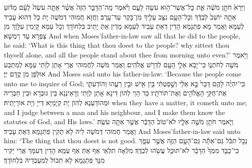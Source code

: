 {%
{וַיַּרְא֙ חֹתֵ֣ן מֹשֶׁ֔ה אֵ֛ת כׇּל־אֲשֶׁר־ה֥וּא עֹשֶׂ֖ה לָעָ֑ם וַיֹּ֗אמֶר מָֽה־הַדָּבָ֤ר הַזֶּה֙ אֲשֶׁ֨ר אַתָּ֤ה עֹשֶׂה֙ לָעָ֔ם מַדּ֗וּעַ אַתָּ֤ה יוֹשֵׁב֙ לְבַדֶּ֔ךָ וְכׇל־הָעָ֛ם נִצָּ֥ב עָלֶ֖יךָ מִן־בֹּ֥קֶר עַד־עָֽרֶב׃}
{וַחֲזָא חֲמוּהִי דְּמֹשֶׁה יָת כָּל דְּהוּא עָבֵיד לְעַמָּא וַאֲמַר מָא פִתְגָמָא הָדֵין דְּאַתְּ עָבֵיד לְעַמָּא מָדֵין אַתְּ יָתֵיב בִּלְחוֹדָךְ וְכָל עַמָּא קָיְמִין עִלָּוָךְ מִן צַפְרָא עַד רַמְשָׁא׃}
{And when Moses’father-in-law saw all that he did to the people, he said: ‘What is this thing that thou doest to the people? why sittest thou thyself alone, and all the people stand about thee from morning unto even?’}{}
{וַיֹּ֥אמֶר מֹשֶׁ֖ה לְחֹתְנ֑וֹ כִּֽי־יָבֹ֥א אֵלַ֛י הָעָ֖ם לִדְרֹ֥שׁ אֱלֹהִֽים׃
}
{וַאֲמַר מֹשֶׁה לַחֲמוּהִי אֲרֵי אָתַן לְוָתִי עַמָּא לְמִתְבַּע אוּלְפָן מִן קֳדָם יְיָ׃}
{And Moses said unto his father-in-law: ‘Because the people come unto me to inquire of God;}{}
{כִּֽי־יִהְיֶ֨ה לָהֶ֤ם דָּבָר֙ בָּ֣א אֵלַ֔י וְשָׁ֣פַטְתִּ֔י בֵּ֥ין אִ֖ישׁ וּבֵ֣ין רֵעֵ֑הוּ וְהוֹדַעְתִּ֛י אֶת־חֻקֵּ֥י הָאֱלֹהִ֖ים וְאֶת־תּוֹרֹתָֽיו׃
}
{כַּד הָוֵי לְהוֹן דִּינָא אָתַן לְוָתִי וְדָאֵינְנָא בֵּין גּוּבְרָא וּבֵין חַבְרֵיהּ וּמְהוֹדַעְנָא לְהוֹן יָת קְיָמַיָּא דַּייָ וְיָת אוֹרָיָתֵיהּ׃}
{when they have a matter, it cometh unto me; and I judge between a man and his neighbour, and I make them know the statutes of God, and His laws.’}{}
{וַיֹּ֛אמֶר חֹתֵ֥ן מֹשֶׁ֖ה אֵלָ֑יו לֹא־טוֹב֙ הַדָּבָ֔ר אֲשֶׁ֥ר אַתָּ֖ה עֹשֶֽׂה׃
}
{וַאֲמַר חֲמוּהִי דְּמֹשֶׁה לֵיהּ לָא תָקֵין פִּתְגָמָא דְּאַתְּ עָבֵיד׃}
{And Moses’father-in-law said unto him: ‘The thing that thou doest is not good.}{}
{נָבֹ֣ל תִּבֹּ֔ל גַּם־אַתָּ֕ה גַּם־הָעָ֥ם הַזֶּ֖ה אֲשֶׁ֣ר עִמָּ֑ךְ כִּֽי־כָבֵ֤ד מִמְּךָ֙ הַדָּבָ֔ר לֹא־תוּכַ֥ל עֲשֹׂ֖הוּ לְבַדֶּֽךָ׃
}
{מִלְאָה תִלְאֵי אַף אַתְּ אַף עַמָּא הָדֵין דְּעִמָּךְ אֲרֵי יַקִּיר מִנָּךְ פִּתְגָמָא לָא תִכּוֹל לְמִעְבְּדֵיהּ בִּלְחוֹדָךְ׃}
}
